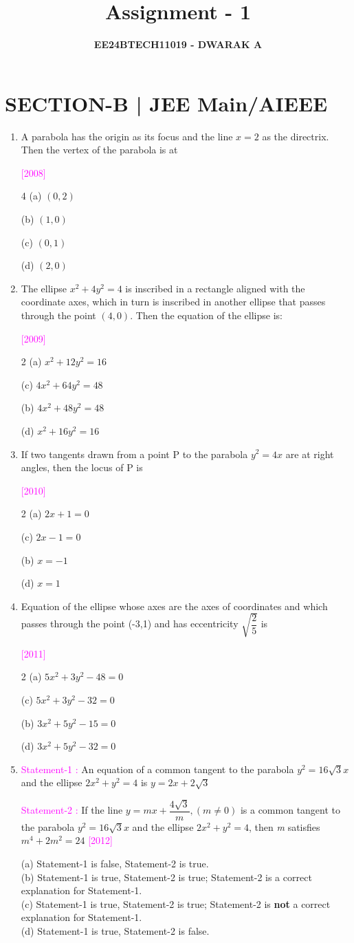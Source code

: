 \documentclass[journal,12pt,twocolumn]{IEEEtran}
\theoremstyle{remark}
\newcommand{\questionA}[6]{
\item #1
    \textcolor{magenta}{[#2]}
    
    (a) #3\\
    (b) #4\\
    (c) #5\\
    (d) #6\\
}
\newcommand{\questionB}[6]{
\item #1
    \begin{flushright}
        {\textcolor{magenta}{[#2]}}
    \end{flushright}
    \begin{multicols}{2}
        (a) #3
        
        (c) #5
        
        (b) #4
        
        (d) #6
    \end{multicols}
}
\newcommand{\questionC}[6]{
\item #1
    \begin{flushright}
        {\textcolor{magenta}{[#2]}}
    \end{flushright}
    \begin{multicols}{4}
        (a) #3
        
        (b) #4
        
        (c) #5
        
        (d) #6
    \end{multicols}
}
\begin{document}

\vspace{3cm}

\title{\textbf{Assignment - 1}}
    \author{\textbf{EE24BTECH11019 - DWARAK A}}
\maketitle
\newpage
\bigskip

\renewcommand{\thefigure}{\theenumi}
\renewcommand{\thetable}{\theenumi}

\section*{\textbf{SECTION-B | JEE Main/AIEEE}}
\bigskip

\begin{enumerate}[label=\textcolor{magenta}{\arabic*.}]

\questionC{A parabola has the origin as its focus and the line $x=2$ as the directrix. Then the vertex of the parabola is at}{2008}
{$(0,2)$}
{$(1,0)$}
{$(0,1)$}
{$(2,0)$}

\questionB{The ellipse $x^2+4y^2=4$ is inscribed in a rectangle aligned with the coordinate axes, which in turn is inscribed in another ellipse that passes through the point $(4,0)$. Then the equation of the ellipse is:}{2009}
{$x^2+12y^2=16$}
{$4x^2+48y^2=48$}
{$4x^2+64y^2=48$}
{$x^2+16y^2=16$}

\questionB{If two tangents drawn from a point P to the parabola $y^2=4x$ are at right angles, then the locus of P is}{2010}
{$2x+1=0$}
{$x=-1$}
{$2x-1=0$}
{$x=1$}

\questionB{Equation of the ellipse whose axes are the axes of coordinates and which passes through the point (-3,1) and has eccentricity $\sqrt{\dfrac{2}{5}}$ is}{2011}
{$5x^2+3y^2-48=0$}
{$3x^2+5y^2-15=0$}
{$5x^2+3y^2-32=0$}
{$3x^2+5y^2-32=0$}

\questionA{\textcolor{magenta}{Statement-1 :} An equation of a common tangent to the parabola $y^2=16\sqrt{3}x$ and the ellipse $2x^2+y^2=4$ is $y=2x+2\sqrt{3}$ 

\textcolor{magenta}{Statement-2 :} If the line $y=mx+\dfrac{4\sqrt{3}}{m},(m\neq0)$ is a common tangent to the parabola $y^2=16\sqrt{3}x$ and the ellipse $2x^2+y^2=4$, then \textit{m} satisfies $m^4+2m^2=24$}{2012}
{Statement-1 is false, Statement-2 is true.}
{Statement-1 is true, Statement-2 is true; Statement-2 is a correct explanation for Statement-1.}
{Statement-1 is true, Statement-2 is true; Statement-2 is \textbf{not} a correct explanation for Statement-1.}
{Statement-1 is true, Statement-2 is false.}


\end{enumerate}
\end{document}
